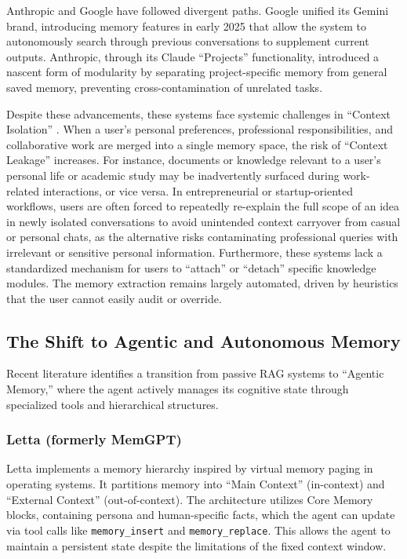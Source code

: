 ﻿\documentclass[12pt,a4paper]{article}
\begin{document}
Anthropic and Google have followed divergent paths. Google unified its Gemini brand, introducing memory features in early 2025 that allow the system to autonomously search through previous conversations to supplement current outputs. Anthropic, through its Claude ``Projects'' functionality, introduced a nascent form of modularity by separating project-specific memory from general saved memory, preventing cross-contamination of unrelated tasks.

Despite these advancements, these systems face systemic challenges in ``Context Isolation'' \cite{wu2024secgpt}. When a user's personal preferences, professional responsibilities, and collaborative work are merged into a single memory space, the risk of ``Context Leakage'' increases. For instance, documents or knowledge relevant to a user's personal life or academic study may be inadvertently surfaced during work-related interactions, or vice versa. In entrepreneurial or startup-oriented workflows, users are often forced to repeatedly re-explain the full scope of an idea in newly isolated conversations to avoid unintended context carryover from casual or personal chats, as the alternative risks contaminating professional queries with irrelevant or sensitive personal information. Furthermore, these systems lack a standardized mechanism for users to ``attach'' or ``detach'' specific knowledge modules. The memory extraction remains largely automated, driven by heuristics that the user cannot easily audit or override.

\subsection{The Shift to Agentic and Autonomous Memory}

Recent literature identifies a transition from passive RAG systems to ``Agentic Memory,'' where the agent actively manages its cognitive state through specialized tools and hierarchical structures.

\subsubsection{Letta (formerly MemGPT)}

Letta \cite{packer2023memgpt} implements a memory hierarchy inspired by virtual memory paging in operating systems. It partitions memory into ``Main Context'' (in-context) and ``External Context'' (out-of-context). The architecture utilizes Core Memory blocks, containing persona and human-specific facts, which the agent can update via tool calls like \texttt{memory\_insert} and \texttt{memory\_replace}. This allows the agent to maintain a persistent state despite the limitations of the fixed context window.
\end{document}
